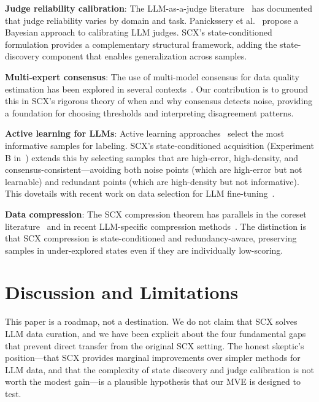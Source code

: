 \documentclass[11pt,twocolumn]{article}
\begin{document}
\textbf{Judge reliability calibration}: The LLM-as-a-judge literature~\cite{zheng2024judging,wang2023judging,panickssery2024llm} has documented that judge reliability varies by domain and task. Panickssery et al.~\cite{panickssery2024llm} propose a Bayesian approach to calibrating LLM judges. SCX's state-conditioned formulation provides a complementary structural framework, adding the state-discovery component that enables generalization across samples.

\textbf{Multi-expert consensus}: The use of multi-model consensus for data quality estimation has been explored in several contexts~\cite{jungo2020calibration,malinin2018predictive,lakshminarayanan2017deep}. Our contribution is to ground this in SCX's rigorous theory of when and why consensus detects noise, providing a foundation for choosing thresholds and interpreting disagreement patterns.

\textbf{Active learning for LLMs}: Active learning approaches~\cite{zhang2022active,dorr2022active,mindermann2022prioritized} select the most informative samples for labeling. SCX's state-conditioned acquisition (Experiment B in~\cite{scx2026}) extends this by selecting samples that are high-error, high-density, and consensus-consistent---avoiding both noise points (which are high-error but not learnable) and redundant points (which are high-density but not informative). This dovetails with recent work on data selection for LLM fine-tuning~\cite{xia2024less,choe2024loga}.

\textbf{Data compression}: The SCX compression theorem has parallels in the coreset literature~\cite{feldman2013turning,ceylan2022coreset,borsos2024mindsmall} and in recent LLM-specific compression methods~\cite{brown2024best,marion2024pruning}. The distinction is that SCX compression is state-conditioned and redundancy-aware, preserving samples in under-explored states even if they are individually low-scoring.

\section{Discussion and Limitations}

This paper is a roadmap, not a destination. We do not claim that SCX solves LLM data curation, and we have been explicit about the four fundamental gaps that prevent direct transfer from the original SCX setting. The honest skeptic's position---that SCX provides marginal improvements over simpler methods for LLM data, and that the complexity of state discovery and judge calibration is not worth the modest gain---is a plausible hypothesis that our MVE is designed to test.
\end{document}
